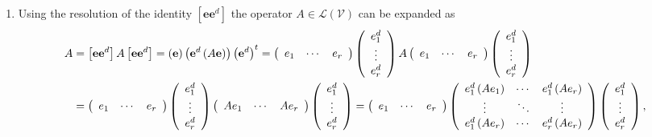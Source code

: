 \documentclass[aps,preprint]{revtex4}%
\begin{document}
\begin{enumerate}
\item Using the resolution of the identity $\left[  \mathbf{ee}^{d}\right]  $
the operator $A\in\mathcal{L}\left(  \mathcal{V}\right)  $ can be expanded as
\begin{align}
A  &  =\left[  \mathbf{ee}^{d}\right]  A\left[  \mathbf{ee}^{d}\right]
=\left(  \mathbf{e}\right)  \left(  \mathbf{e}^{d}\left(  A\mathbf{e}\right)
\right)  \left(  \mathbf{e}^{d}\right)  ^{t}=\left(
\begin{array}
[c]{ccc}%
e_{1} & \cdots & e_{r}%
\end{array}
\right)  \left(
\begin{array}
[c]{c}%
e_{1}^{d}\\
\vdots\\
e_{r}^{d}%
\end{array}
\right)  A\left(
\begin{array}
[c]{ccc}%
e_{1} & \cdots & e_{r}%
\end{array}
\right)  \left(
\begin{array}
[c]{c}%
e_{1}^{d}\\
\vdots\\
e_{r}^{d}%
\end{array}
\right) \\
&  =\left(
\begin{array}
[c]{ccc}%
e_{1} & \cdots & e_{r}%
\end{array}
\right)  \left(
\begin{array}
[c]{c}%
e_{1}^{d}\\
\vdots\\
e_{r}^{d}%
\end{array}
\right)  \left(
\begin{array}
[c]{ccc}%
Ae_{1} & \cdots & Ae_{r}%
\end{array}
\right)  \left(
\begin{array}
[c]{c}%
e_{1}^{d}\\
\vdots\\
e_{r}^{d}%
\end{array}
\right)  =\left(
\begin{array}
[c]{ccc}%
e_{1} & \cdots & e_{r}%
\end{array}
\right)  \left(
\begin{array}
[c]{ccc}%
e_{1}^{d}\left(  Ae_{1}\right)  & \cdots & e_{1}^{d}\left(  Ae_{r}\right) \\
\vdots & \ddots & \vdots\\
e_{1}^{d}\left(  Ae_{r}\right)  & \cdots & e_{r}^{d}\left(  Ae_{r}\right)
\end{array}
\right)  \left(
\begin{array}
[c]{c}%
e_{1}^{d}\\
\vdots\\
e_{r}^{d}%
\end{array}
\right)  ,
\end{align}



\end{enumerate}
\end{document}
